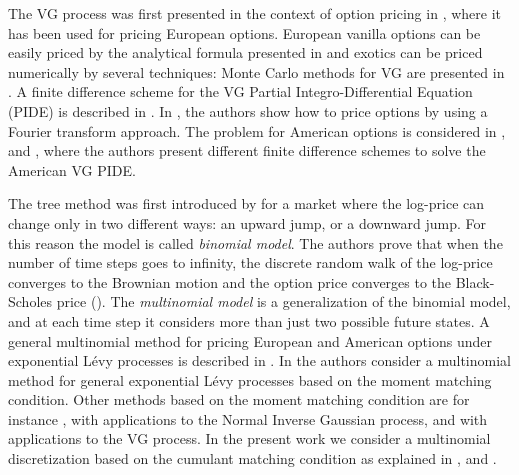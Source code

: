 \documentclass[]{interact}
\theoremstyle{plain}%
\theoremstyle{definition}
\theoremstyle{remark}
\begin{document}
The VG process was first presented in the context of option pricing 
in \cite{MaMi91}, where it has been used for pricing European options.
European vanilla options can be easily priced by the analytical formula presented in \cite{MCC98} and exotics
can be priced numerically by several techniques:
Monte Carlo methods for VG are presented in \cite{Fu00}. 
A finite difference scheme for the VG Partial Integro-Differential Equation (PIDE) 
is described in \cite{CoVo05b}. In \cite{CaMa98}, the authors show how to price options by using a Fourier transform approach.
The problem for American options is considered in \cite{Al05}, \cite{Oo05} and \cite{HiMa01}, where the authors present different finite difference 
schemes to solve the American VG PIDE.

The tree method was first introduced by \cite{CRR79} for a market where the log-price can change only in two different ways: 
an upward jump, or a downward jump. For this reason the model is called \emph{binomial model}. The authors 
prove that when the number of time steps goes to infinity, the discrete random walk of the log-price converges to the Brownian motion
and the option price converges to the Black-Scholes price (\cite{BS73}).
The \emph{multinomial model} is a generalization of the binomial model, and at each time step it considers 
more than just two possible future states.
A general multinomial method for pricing European and American options under exponential L\'evy processes is described in \cite{MaSoSz}. 
In \cite{KeWe06} the authors consider a multinomial method for general exponential L\'evy processes based on the moment matching condition.
Other methods based on the moment matching condition are for instance \cite{HaMac10}, with applications to the Normal Inverse Gaussian process, and 
\cite{See13} with applications to the VG process.  
In the present work we consider a multinomial discretization based on the cumulant matching condition as explained in \cite{YaPr01}, \cite{YaPr03} and \cite{YaPr06}. 
\end{document}
